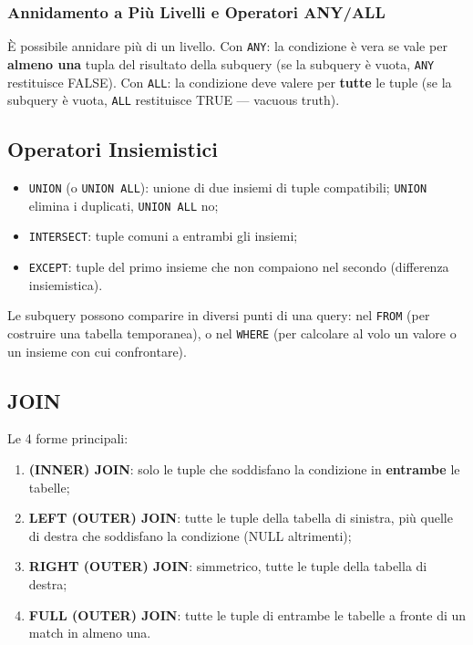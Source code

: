 \documentclass[12pt, a4paper]{article}
\begin{document}
\subsubsection{Annidamento a Più Livelli e Operatori ANY/ALL}
È possibile annidare più di un livello. Con \texttt{ANY}: la condizione è vera se vale per \textbf{almeno una} tupla del risultato della subquery (se la subquery è vuota, \texttt{ANY} restituisce FALSE). Con \texttt{ALL}: la condizione deve valere per \textbf{tutte} le tuple (se la subquery è vuota, \texttt{ALL} restituisce TRUE — vacuous truth).

\subsection{Operatori Insiemistici}
\begin{itemize}
    \item \texttt{UNION} (o \texttt{UNION ALL}): unione di due insiemi di tuple compatibili; \texttt{UNION} elimina i duplicati, \texttt{UNION ALL} no;
    \item \texttt{INTERSECT}: tuple comuni a entrambi gli insiemi;
    \item \texttt{EXCEPT}: tuple del primo insieme che non compaiono nel secondo (differenza insiemistica).
\end{itemize}

Le subquery possono comparire in diversi punti di una query: nel \texttt{FROM} (per costruire una tabella temporanea), o nel \texttt{WHERE} (per calcolare al volo un valore o un insieme con cui confrontare).

\subsection{JOIN}

Le 4 forme principali:
\begin{enumerate}
    \item \textbf{(INNER) JOIN}: solo le tuple che soddisfano la condizione in \textbf{entrambe} le tabelle;
    \item \textbf{LEFT (OUTER) JOIN}: tutte le tuple della tabella di sinistra, più quelle di destra che soddisfano la condizione (NULL altrimenti);
    \item \textbf{RIGHT (OUTER) JOIN}: simmetrico, tutte le tuple della tabella di destra;
    \item \textbf{FULL (OUTER) JOIN}: tutte le tuple di entrambe le tabelle a fronte di un match in almeno una\footnotemark.
\end{enumerate}
\end{document}
